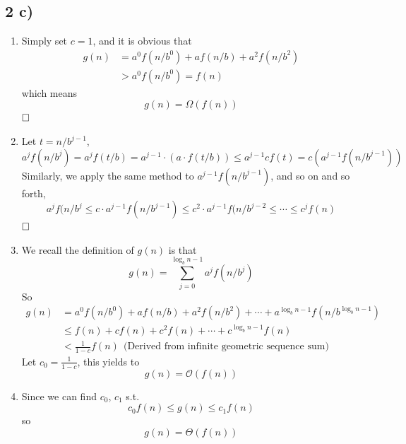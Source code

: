 \documentclass[A4paper]{article}
\newcommand{\qedhere}{$\hfill\ensuremath{\square}$}
\begin{document}
\subsection*{2 c)}
\begin{enumerate}
\item Simply set $c = 1$, and it is obvious that 
\[
	\begin{aligned}
	g(n) &= a^0 f(n/b^0) + af(n/b) + a^2 f(n/b^2) \\
		& > a^0 f(n/b^0) = f(n)
	\end{aligned}
\]
which means 
\[
	g(n) = \Omega (f(n))
\]
\qedhere
\item Let $t = n/b^{j-1}$,
\[
	a^j f(n/b^j)= a^j f(t/b) = a^{j-1} \cdot (a\cdot f(t/b)) \leq  a^{j-1} c f(t) = c(a^{j-1}  f(n/b^{j-1}))
\]
Similarly, we apply the same method to $a^{j-1}f(n/b^{j-1})$, and so on and so forth,
\[
	a^jf(n/b^j\leq c\cdot a^{j-1} f(n/b^{j-1}) \leq c^2 \cdot  a^{j-1} f(n/b^{j-2} \leq \cdots \leq c^j f(n)
\]
\qedhere
\item We recall the definition of $g(n)$ is that 
\[
 	g(n) = \sum_{j=0} ^{\log_b n-1} a^j f(n/b^j) 	
\]
So 
\[
	\begin{aligned}
	g(n) &= a^0 f(n/b^0) + af(n/b) + a^2 f(n/b^2) + \cdots + a^{\log_bn-1}f(n/b^{\log_bn-1})
	\\ & \leq f(n) + c f(n) + c^2 f(n) + \cdots + c^{\log_b n-1} f(n)
	\\ & < \frac{1}{1-c} f(n) \ \ \text{(Derived from infinite geometric sequence sum)}
	\end{aligned}
\]
Let $c_0= \frac{1}{1-c}$, this yields to \[
	g(n)= \mathcal{O} (f(n))
\]
\item Since we can find $c_0$, $c_1$ s.t. 
\[
	c_0 f(n) \leq g(n) \leq c_1 f(n)
\]
so \[
	g(n) = \Theta(f(n))
\]
\end{enumerate}
\end{document}
